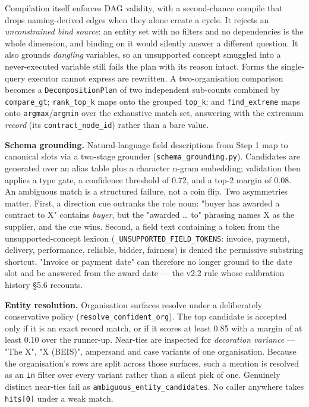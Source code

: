 Compilation itself enforces DAG validity, with a second-chance compile that drops naming-derived edges when they alone create a cycle. It rejects an \emph{unconstrained bind source}: an entity set with no filters and no dependencies is the whole dimension, and binding on it would silently answer a different question. It also grounds \emph{dangling} variables, so an unsupported concept smuggled into a never-executed variable still fails the plan with its reason intact. Forms the single-query executor cannot express are rewritten. A two-organisation comparison becomes a \texttt{DecompositionPlan} of two independent sub-counts combined by \texttt{compare\_gt}; \texttt{rank\_top\_k} maps onto the grouped \texttt{top\_k}; and \texttt{find\_extreme} maps onto \texttt{argmax}/\texttt{argmin} over the exhaustive match set, answering with the extremum \emph{record} (its \texttt{contract\_node\_id}) rather than a bare value.

\textbf{Schema grounding.} Natural-language field descriptions from Step 1 map to canonical slots via a two-stage grounder (\texttt{schema\_grounding.py}). Candidates are generated over an alias table plus a character n-gram embedding; validation then applies a type gate, a confidence threshold of 0.72, and a top-2 margin of 0.08. An ambiguous match is a structured failure, not a coin flip. Two asymmetries matter. First, a direction cue outranks the role noun: "buyer has awarded a contract to X" contains \emph{buyer}, but the "awarded \ldots{} to" phrasing names X as the supplier, and the cue wins. Second, a field text containing a token from the unsupported-concept lexicon (\texttt{\_UNSUPPORTED\_FIELD\_TOKENS}: invoice, payment, delivery, performance, reliable, bidder, fairness) is denied the permissive substring shortcut. "Invoice or payment date" can therefore no longer ground to the date slot and be answered from the award date --- the v2.2 rule whose calibration history §5.6 recounts.

\textbf{Entity resolution.} Organisation surfaces resolve under a deliberately conservative policy (\texttt{resolve\_confident\_org}). The top candidate is accepted only if it is an exact record match, or if it scores at least 0.85 with a margin of at least 0.10 over the runner-up. Near-ties are inspected for \emph{decoration variance} --- "The X", "X (BEIS)", ampersand and case variants of one organisation. Because the organisation's rows are split across those surfaces, such a mention is resolved as an \texttt{in} filter over every variant rather than a silent pick of one. Genuinely distinct near-ties fail as \texttt{ambiguous\_entity\_candidates}. No caller anywhere takes \texttt{hits[0]} under a weak match.

